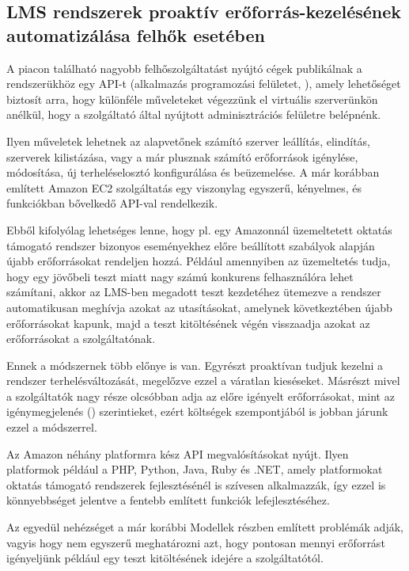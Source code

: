 \subsection{LMS rendszerek proaktív erőforrás-kezelésének automatizálása felhők esetében}

A piacon található nagyobb felhőszolgáltatást nyújtó cégek publikálnak a rendszerükhöz egy API-t (alkalmazás programozási felületet, ), amely lehetőséget biztosít arra, hogy különféle műveleteket végezzünk el virtuális szerverünkön anélkül, hogy a szolgáltató által nyújtott adminisztrációs felületre belépnénk.

Ilyen műveletek lehetnek az alapvetőnek számító szerver leállítás, elindítás, szerverek kilistázása, vagy a már plusznak számító erőforrások igénylése, módosítása, új terheléselosztó konfigurálása és beüzemelése. A már korábban említett Amazon EC2 szolgáltatás egy viszonylag egyszerű, kényelmes, és funkciókban bővelkedő API-val rendelkezik.

Ebből kifolyólag lehetséges lenne, hogy pl. egy Amazonnál üzemeltetett oktatás támogató rendszer bizonyos eseményekhez előre beállított szabályok alapján újabb erőforrásokat rendeljen hozzá. Például amennyiben az üzemeltetés tudja, hogy egy jövőbeli teszt miatt nagy számú konkurens felhasználóra lehet számítani, akkor az LMS-ben megadott teszt kezdetéhez ütemezve a rendszer automatikusan meghívja azokat az utasításokat, amelynek következtében újabb erőforrásokat kapunk, majd a teszt kitöltésének végén visszaadja azokat az erőforrásokat a szolgáltatónak.

Ennek a módszernek több előnye is van. Egyrészt proaktívan tudjuk kezelni a rendszer terhelésváltozását, megelőzve ezzel a váratlan kieséseket. Másrészt mivel a szolgáltatók nagy része olcsóbban adja az előre igényelt erőforrásokat, mint az igénymegjelenés () szerintieket, ezért költségek szempontjából is jobban járunk ezzel a módszerrel.

Az Amazon néhány platformra kész API megvalósításokat nyújt. Ilyen platformok például a PHP, Python, Java, Ruby és .NET, amely platformokat oktatás támogató rendszerek fejlesztésénél is szívesen alkalmazzák, így ezzel is könnyebbséget jelentve a fentebb említett funkciók lefejlesztéséhez.

Az egyedül nehézséget a már korábbi Modellek részben említett problémák adják, vagyis hogy nem egyszerű meghatározni azt, hogy pontosan mennyi erőforrást igényeljünk például egy teszt kitöltésének idejére a szolgáltatótól. 

